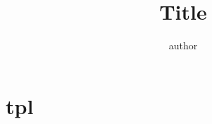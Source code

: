 \documentclass{article}
\title{Title}
\author{author}
\date{ }
\theoremstyle{mytheoremstyle}
\theoremstyle{mytheoremstyle}
\theoremstyle{myproblemstyle}
\begin{document}
  \maketitle

  \section{tpl}

  
\end{document}
